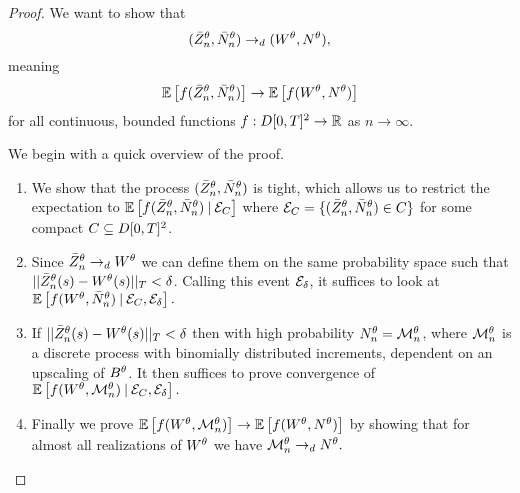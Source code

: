 \begin{proof}



We want to show that
\begin{equation*}
(\bar{Z}^{\theta}_n, \bar{N}_n^{\theta}) \rightarrow_d (W^{\theta}, N^{\theta}),
\end{equation*}
meaning 
\begin{equation*}
\mathbb{E} \left[ f(\bar{Z}^{\theta}_n, \bar{N}_n^{\theta}) \right] \rightarrow \mathbb{E} \left[ f(W^{\theta}, N^{\theta}) \right]
\end{equation*}
for all continuous, bounded functions $f:D[0,T]^2\rightarrow\mathbb{R}$ as $n \rightarrow \infty$.

We begin with a quick overview of the proof.
\begin{enumerate}
	\item We show that the process $(\bar{Z}^{\theta}_n, \bar{N}_n^{\theta})$ is tight,
	which allows us to restrict the expectation to
	\begin{math}
		\mathbb{E} \left[ f(\bar{Z}^{\theta}_n, \bar{N}_n^{\theta}) \: | \: \mathcal{E}_{C} \right]
	\end{math}
	where
	\begin{math}
		\mathcal{E}_{C} = \{ (\bar{Z}^{\theta}_n, \bar{N}_n^{\theta}) \in C \}
	\end{math}
	for some compact $C \subseteq D[0, T]^2$.
	
	\item Since $\bar{Z}^{\theta}_n \rightarrow_d W^{\theta}$ we can define them on the same probability space such that
	$||\bar{Z}^{\theta}_n(s) - W^{\theta}(s)||_T < \delta$. 
	Calling this event $\mathcal{E}_{\delta}$,
	it suffices to look at
	\begin{math}
	\mathbb{E} \left[ f(W^{\theta}, \bar{N}_n^{\theta}) \: | \: \mathcal{E}_{C}, \mathcal{E}_{\delta} \right].
	\end{math}
	
	\item If $||\bar{Z}^{\theta}_n(s) - W^{\theta}(s)||_T < \delta$ then with high probability $N_n^{\theta} = \mathcal{M}_n^{\theta}$,
	where $\mathcal{M}_n^{\theta}$ is a discrete process with binomially distributed increments,
	dependent on an upscaling of $B^{\theta}$.
	It then suffices to prove convergence of 
	\begin{math}
		\mathbb{E} \left[ f(W^{\theta}, \mathcal{M}_n^{\theta}) \: | \: \mathcal{E}_{C}, \mathcal{E}_{\delta} \right].
	\end{math}	
	
	\item Finally we prove
	\begin{math}
		\mathbb{E} \left[ f(W^{\theta}, \mathcal{M}_n^{\theta}) \right] \rightarrow \mathbb{E} \left[ f(W^{\theta}, N^{\theta}) \right]
	\end{math}
	by showing that for almost all realizations of $W^{\theta}$ we have
	\begin{math}
		\mathcal{M}_n^{\theta} \rightarrow_d N^{\theta}.
	\end{math}
\end{enumerate}



\end{proof}
